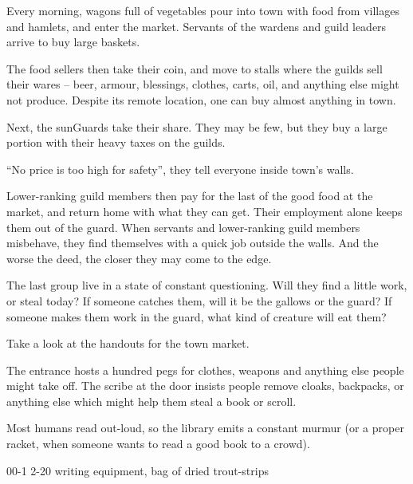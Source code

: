 \begin{multicols}{2}
Every morning, wagons full of vegetables pour into \gls{town} with food from \glspl{village} and hamlets, and enter the market.
Servants of the \glspl{warden} and guild leaders arrive to buy large baskets.

The food sellers then take their coin, and move to stalls where the guilds sell their wares -- beer, armour, blessings, clothes, carts, oil, and anything else  might not produce.
Despite its remote location, one can buy almost anything in \gls{town}.

Next, the \glspl{sunGuard} take their share.
They may be few, but they buy a large portion with their heavy taxes on the guilds.

``No price is too high for safety'', they tell everyone inside \gls{town}'s walls.

Lower-ranking guild members then pay for the last of the good food at the market, and return home with what they can get.
Their employment alone keeps them out of the \gls{guard}.
When servants and lower-ranking guild members misbehave, they find themselves with a quick job outside the walls.
And the worse the deed, the closer they may come to the \gls{edge}.

The last group live in a state of constant questioning.
Will they find a little work, or steal today?
If someone catches them, will it be the gallows or the guard?
If someone makes them work in the \gls{guard}, what kind of creature will eat them?

Take a look at the handouts for the \gls{town} market.


The entrance hosts a hundred pegs for clothes, weapons and anything else people might take off.
The \gls{scribe} at the door insists people remove cloaks, backpacks, or anything else which might help them steal a book or scroll.

Most humans read out-loud, so the library emits a constant murmur (or a proper racket, when someone wants to read a good book to a crowd).

\label{greyLibrarian}
%
  {{0}{0}{-1}}%
  {{2}{-2}{0}}%
  {
    \setcounter{Academics}{3}
    \setcounter{Crafts}{1}
    \setcounter{Empathy}{1}
  }%
  {%
  }%
  {writing equipment, bag of dried trout-strips}%
  {}%


\end{multicols}
